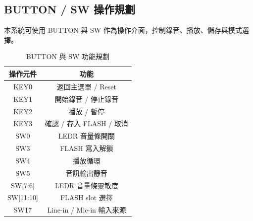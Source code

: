 



\subsection{BUTTON / SW 操作規劃}

本系統可使用 BUTTON 與 SW 作為操作介面，控制錄音、播放、儲存與模式選擇。

\begin{table}[H]
\centering
\caption{BUTTON 與 SW 功能規劃}
\begin{tabular}{cc}
\toprule
操作元件 & 功能 \\
\midrule
KEY0 & 返回主選單 / Reset \\
KEY1 & 開始錄音 / 停止錄音 \\
KEY2 & 播放 / 暫停 \\
KEY3 & 確認 / 存入 FLASH / 取消 \\
SW0 & LEDR 音量條開關 \\
SW3 & FLASH 寫入解鎖 \\
SW4 & 播放循環 \\
SW5 & 音訊輸出靜音 \\
SW[7:6] & LEDR 音量條靈敏度 \\
SW[11:10] & FLASH slot 選擇 \\
SW17 & Line-in / Mic-in 輸入來源 \\
\bottomrule
\end{tabular}
\end{table}
